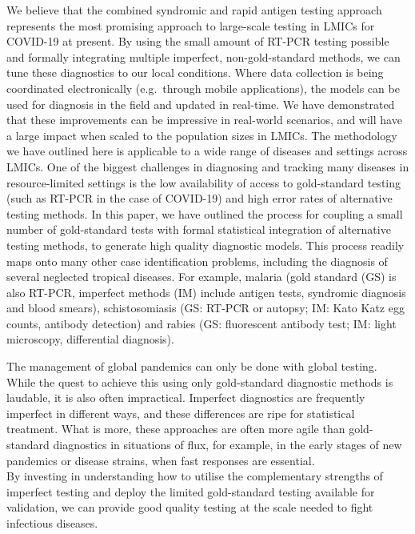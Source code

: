 \documentclass[]{elsarticle} %
\begin{document}
We believe that the combined syndromic and rapid antigen testing approach represents the most promising approach to large-scale testing in LMICs for COVID-19 at present.
By using the small amount of RT-PCR testing possible and formally integrating multiple imperfect, non-gold-standard methods, we can tune these diagnostics to our local conditions.
Where data collection is being coordinated electronically (e.g.~through mobile applications), the models can be used for diagnosis in the field and updated in real-time.
We have demonstrated that these improvements can be impressive in real-world scenarios, and will have a large impact when scaled to the population sizes in LMICs.
The methodology we have outlined here is applicable to a wide range of diseases and settings across LMICs.
One of the biggest challenges in diagnosing and tracking many diseases in resource-limited settings is the low availability of access to gold-standard testing (such as RT-PCR in the case of COVID-19) and high error rates of alternative testing methods.
In this paper, we have outlined the process for coupling a small number of gold-standard tests with formal statistical integration of alternative testing methods, to generate high quality diagnostic models.
This process readily maps onto many other case identification problems, including the diagnosis of several neglected tropical diseases. For example, malaria (gold standard (GS) is also RT-PCR, imperfect methods (IM) include antigen tests, syndromic diagnosis and blood smears), schistosomiasis (GS: RT-PCR or autopsy; IM: Kato Katz egg counts, antibody detection) and rabies (GS: fluorescent antibody test; IM: light microscopy, differential diagnosis).

The management of global pandemics can only be done with global testing.
While the quest to achieve this using only gold-standard diagnostic methods is laudable, it is also often impractical.
Imperfect diagnostics are frequently imperfect in different ways, and these differences are ripe for statistical treatment.
What is more, these approaches are often more agile than gold-standard diagnostics in situations of flux, for example, in the early stages of new pandemics or disease strains, when fast responses are essential.\\
By investing in understanding how to utilise the complementary strengths of imperfect testing and deploy the limited gold-standard testing available for validation, we can provide good quality testing at the scale needed to fight infectious diseases.
\end{document}
